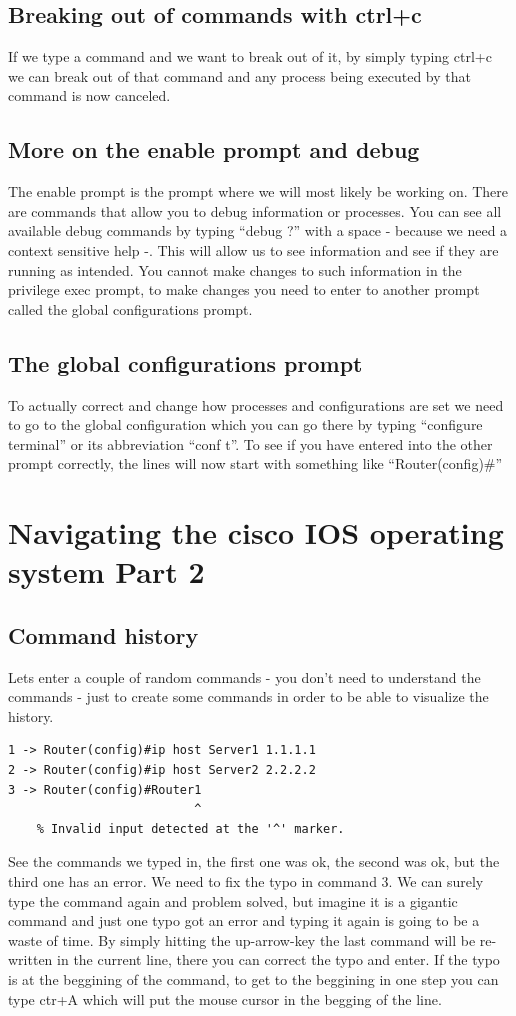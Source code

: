 \subsection{Breaking out of commands with ctrl+c}
If we type a command and we want to break out of it, by simply typing ctrl+c we can break out of that command and any process being executed by that command is now canceled.

\subsection{More on the enable prompt and debug}
The enable prompt is the prompt where we will most likely be working on. There are commands that allow you to debug information or processes. You can see all available debug commands by typing ``debug ?'' with a space - because we need a context sensitive help -. This will allow us to see information and see if they are running as intended. You cannot make changes to such information in the privilege exec prompt, to make changes you need to enter to another prompt called the global configurations prompt.

\subsection{The global configurations prompt}
To actually correct and change how processes and configurations are set we need to go to the global configuration which you can go there by typing ``configure terminal'' or its abbreviation ``conf t''. To see if you have entered into the other prompt correctly, the lines will now start with something like ``Router(config)\#''


\section{Navigating the cisco IOS operating system Part 2}
\subsection{Command history}
Lets enter a couple of random commands - you don't need to understand the commands - just to create some commands in order to be able to visualize the history. 
\begin{verbatim}
1 -> Router(config)#ip host Server1 1.1.1.1
2 -> Router(config)#ip host Server2 2.2.2.2
3 -> Router(config)#Router1
                          ^
    % Invalid input detected at the '^' marker.
\end{verbatim}
See the commands we typed in, the first one was ok, the second was ok, but the third one has an error. We need to fix the typo in command 3. We can surely type the command again and problem solved, but imagine it is a gigantic command and just one typo got an error and typing it again is going to be a waste of time. By simply hitting the up-arrow-key the last command will be re-written in the current line, there you can correct the typo and enter. If the typo is at the beggining of the command, to get to the beggining in one step you can type ctr+A which will put the mouse cursor in the begging of the line.


